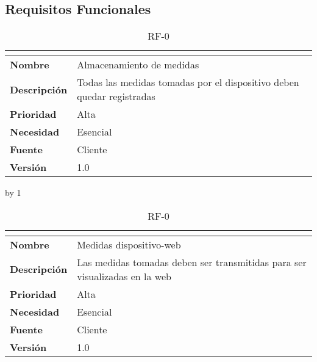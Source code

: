 \subsection{Requisitos Funcionales}
\newcount\rf
{}
\begin{table}[H]
	\caption{RF-0\number\rf}
	\begin{tabular}{|l|p{}|}
		\hline
		\multicolumn{2}{|c|}{\cellcolor[HTML]{BFBFBF}{\color[HTML]{000000} \textbf{RF-0\number\rf}}} \\ \hline
		\textbf{Nombre}      & Almacenamiento de medidas                                             \\ \hline
		\textbf{Descripción} & Todas las medidas tomadas por el dispositivo deben quedar registradas \\ \hline
		\textbf{Prioridad}   & Alta                                                                  \\ \hline
		\textbf{Necesidad}   & Esencial                                                              \\ \hline
		\textbf{Fuente}      & Cliente                                                               \\ \hline
		\textbf{Versión}     & 1.0                                                                   \\ \hline
	\end{tabular}
\end{table}
\advance\rf by 1
\begin{table}[H]
	\caption{RF-0\number\rf}
	\begin{tabular}{|l|p{}|}
		\hline
		\multicolumn{2}{|c|}{\cellcolor[HTML]{BFBFBF}{\color[HTML]{000000} \textbf{RF-0\number\rf}}} \\ \hline
		\textbf{Nombre}      & Medidas dispositivo-web                                                    \\ \hline
		\textbf{Descripción} & Las medidas tomadas deben ser transmitidas para ser visualizadas en la web \\ \hline
		\textbf{Prioridad}   & Alta                                                                       \\ \hline
		\textbf{Necesidad}   & Esencial                                                                   \\ \hline
		\textbf{Fuente}      & Cliente                                                                    \\ \hline
		\textbf{Versión}     & 1.0                                                                        \\ \hline
	\end{tabular}
\end{table}
